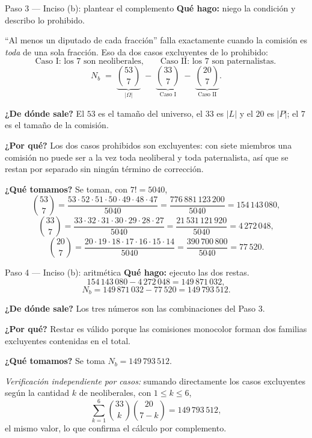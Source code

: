 \documentclass[11pt]{article}
\begin{document}
\begin{paso}{Paso 3 --- Inciso (b): plantear el complemento}
\textbf{Qué hago:} niego la condición y describo lo prohibido.

``Al menos un diputado de cada fracción'' falla exactamente cuando la comisión es \emph{toda} de una sola fracción. Eso da dos casos excluyentes de lo prohibido:
\[
  \text{Caso I: los 7 son neoliberales},\qquad \text{Caso II: los 7 son paternalistas.}
\]
\[
  N_b \;=\; \underbrace{\binom{53}{7}}_{|\Omega|} \;-\; \underbrace{\binom{33}{7}}_{\text{Caso I}} \;-\; \underbrace{\binom{20}{7}}_{\text{Caso II}} .
\]

\textbf{¿De dónde sale?} El $53$ es el tamaño del universo, el $33$ es $|L|$ y el $20$ es $|P|$; el $7$ es el tamaño de la comisión.

\textbf{¿Por qué?} Los dos casos prohibidos son excluyentes: con siete miembros una comisión no puede ser a la vez toda neoliberal y toda paternalista, así que se restan por separado sin ningún término de corrección.

\textbf{¿Qué tomamos?} Se toman, con $7!=5040$,
\[
  \binom{53}{7}=\frac{53\cdot 52\cdot 51\cdot 50\cdot 49\cdot 48\cdot 47}{5040} = \frac{776\,881\,123\,200}{5040} = 154\,143\,080 ,
\]
\[
  \binom{33}{7}=\frac{33\cdot 32\cdot 31\cdot 30\cdot 29\cdot 28\cdot 27}{5040} = \frac{21\,531\,121\,920}{5040} = 4\,272\,048 ,
\]
\[
  \binom{20}{7}=\frac{20\cdot 19\cdot 18\cdot 17\cdot 16\cdot 15\cdot 14}{5040} = \frac{390\,700\,800}{5040} = 77\,520 .
\]
\end{paso}

\begin{paso}{Paso 4 --- Inciso (b): aritmética}
\textbf{Qué hago:} ejecuto las dos restas.
\[
  154\,143\,080 - 4\,272\,048 = 149\,871\,032 ,
\]
\[
  N_b = 149\,871\,032 - 77\,520 = 149\,793\,512 .
\]

\textbf{¿De dónde sale?} Los tres números son las combinaciones del Paso 3.

\textbf{¿Por qué?} Restar es válido porque las comisiones monocolor forman dos familias excluyentes contenidas en el total.

\textbf{¿Qué tomamos?} Se toma $N_b = 149\,793\,512$.

\emph{Verificación independiente por casos:} sumando directamente los casos excluyentes según la cantidad $k$ de neoliberales, con $1\le k\le 6$,
\[
  \sum_{k=1}^{6} \binom{33}{k}\binom{20}{7-k} = 149\,793\,512 ,
\]
el mismo valor, lo que confirma el cálculo por complemento.
\end{paso}
\end{document}
